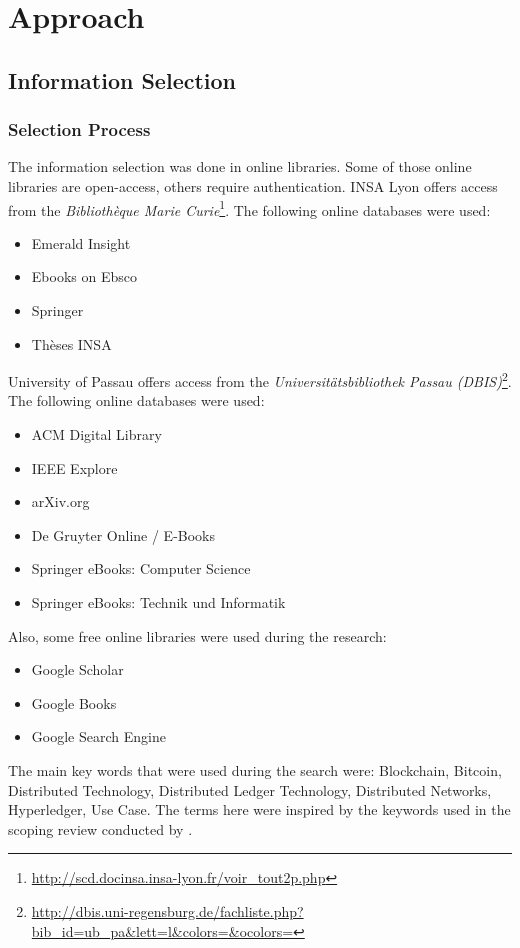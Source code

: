 \section{Approach}
\label{sec:Approach}


\subsection{Information Selection}
\label{subsec:InformationSelection}


\subsubsection{Selection Process}
\label{subsubsec:SelectionProcess}
The information selection was done in online libraries. Some of those online libraries are open-access, others require authentication. 
INSA Lyon offers access from the \textit{Biblioth\`{e}que Marie Curie}\footnote{\url{http://scd.docinsa.insa-lyon.fr/voir_tout2p.php}}. The following online databases were used:
\begin{itemize}[noitemsep]
	\item Emerald Insight
	\item Ebooks on Ebsco
	\item Springer
	\item Thèses INSA
\end{itemize}
University of Passau offers access from the \textit{Universit\"{a}tsbibliothek Passau (DBIS)}\footnote{\url{http://dbis.uni-regensburg.de/fachliste.php?bib_id=ub_pa&lett=l&colors=&ocolors=}}. The following online databases were used:
\begin{itemize}[noitemsep]
	\item ACM Digital Library
	\item IEEE Explore
	\item arXiv.org
	\item De Gruyter Online / E-Books
	\item Springer eBooks: Computer Science
	\item Springer eBooks: Technik und Informatik
\end{itemize}
Also, some free online libraries were used during the research:
\begin{itemize}[noitemsep]
	\item Google Scholar
	\item Google Books
	\item Google Search Engine
\end{itemize}
The main key words that were used during the search were: Blockchain, Bitcoin, Distributed Technology, Distributed Ledger Technology, Distributed Networks, Hyperledger, Use Case. The terms here were inspired by the keywords used in the scoping review conducted by \cite{2018_Li}.


